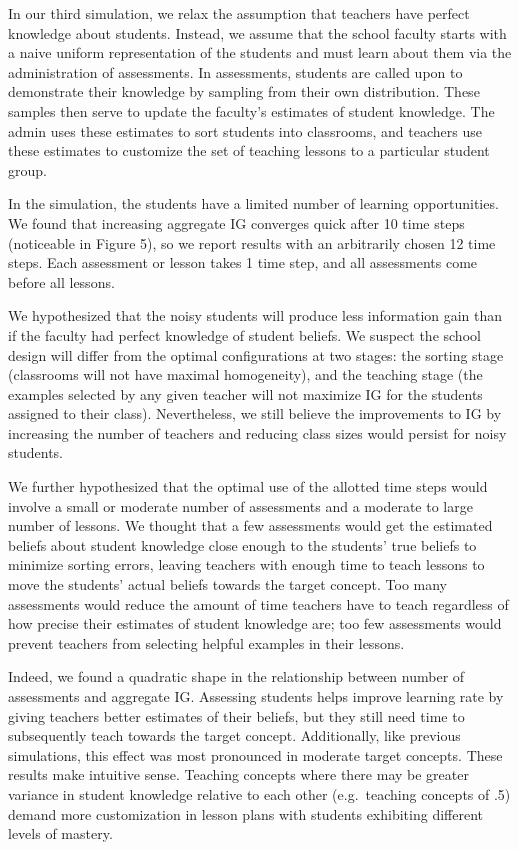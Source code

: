 \documentclass[10pt, letterpaper]{article}
\begin{document}
In our third simulation, we relax the assumption that teachers have
perfect knowledge about students. Instead, we assume that the school
faculty starts with a naive uniform representation of the students and
must learn about them via the administration of assessments. In
assessments, students are called upon to demonstrate their knowledge by
sampling from their own distribution. These samples then serve to update
the faculty's estimates of student knowledge. The admin uses these
estimates to sort students into classrooms, and teachers use these
estimates to customize the set of teaching lessons to a particular
student group.

In the simulation, the students have a limited number of learning
opportunities. We found that increasing aggregate IG converges quick
after 10 time steps (noticeable in Figure 5), so we report results with
an arbitrarily chosen 12 time steps. Each assessment or lesson takes 1
time step, and all assessments come before all lessons.

We hypothesized that the noisy students will produce less information
gain than if the faculty had perfect knowledge of student beliefs. We
suspect the school design will differ from the optimal configurations at
two stages: the sorting stage (classrooms will not have maximal
homogeneity), and the teaching stage (the examples selected by any given
teacher will not maximize IG for the students assigned to their class).
Nevertheless, we still believe the improvements to IG by increasing the
number of teachers and reducing class sizes would persist for noisy
students.

We further hypothesized that the optimal use of the allotted time steps
would involve a small or moderate number of assessments and a moderate
to large number of lessons. We thought that a few assessments would get
the estimated beliefs about student knowledge close enough to the
students' true beliefs to minimize sorting errors, leaving teachers with
enough time to teach lessons to move the students' actual beliefs
towards the target concept. Too many assessments would reduce the amount
of time teachers have to teach regardless of how precise their estimates
of student knowledge are; too few assessments would prevent teachers
from selecting helpful examples in their lessons.

Indeed, we found a quadratic shape in the relationship between number of
assessments and aggregate IG. Assessing students helps improve learning
rate by giving teachers better estimates of their beliefs, but they
still need time to subsequently teach towards the target concept.
Additionally, like previous simulations, this effect was most pronounced
in moderate target concepts. These results make intuitive sense.
Teaching concepts where there may be greater variance in student
knowledge relative to each other (e.g.~teaching concepts of .5) demand
more customization in lesson plans with students exhibiting different
levels of mastery.
\end{document}

